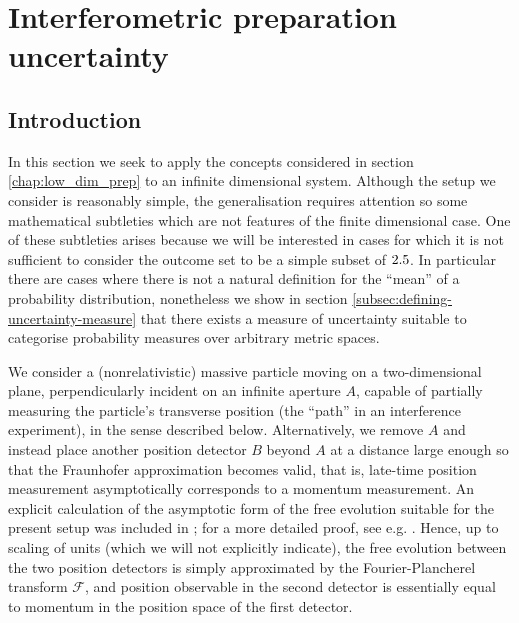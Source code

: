 \chapter{Interferometric preparation uncertainty}\label{chap:interferometric_prep_ur}

\section{Introduction} 

In this section we seek to apply the concepts considered in section \ref{chap:low_dim_prep} to an infinite dimensional system. Although the setup we consider is reasonably simple, the generalisation requires attention so some mathematical subtleties which are not features of the finite dimensional case. One of these subtleties arises because we will be interested in cases for which it is not sufficient to consider the outcome set to be a simple subset of $2.5$. In particular there are cases where there is not a natural definition for the ``mean'' of a probability distribution, nonetheless we show in section \ref{subsec:defining-uncertainty-measure} that there exists a measure of uncertainty suitable to categorise probability measures over arbitrary metric spaces.

We consider a (nonrelativistic) massive particle moving on a two-dimensional plane, perpendicularly incident on an infinite aperture $A$, capable of partially measuring the particle's transverse position (the ``path'' in an interference experiment), in the sense described below. Alternatively, we remove $A$ and instead place another position detector $B$ beyond $A$ at a distance large 
enough so that the Fraunhofer approximation becomes valid, that is, late-time position measurement asymptotically corresponds to a momentum measurement. An explicit calculation of the asymptotic form of the free evolution suitable for the present setup was included in \cite{BB2013}; for a more detailed proof, see e.g. \cite[Theorem IX.31]{RSII}. Hence, up to scaling of units (which we will not explicitly indicate), the free evolution between the two position detectors is simply approximated by the Fourier-Plancherel transform $\mathcal F$, and position observable in the second detector is essentially equal to momentum in the position space of the first detector.

